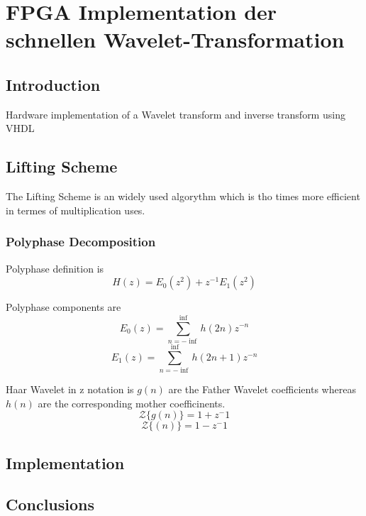 %
%
%
\chapter{FPGA Implementation der schnellen Wavelet-Transformation\label{chapter:fpga}}
\begin{refsection}

\section{Introduction}

Hardware implementation of a Wavelet transform and inverse transform using VHDL


\section{Lifting Scheme}

The Lifting Scheme is an widely used algorythm which is tho times more efficient in termes of multiplication uses. 


\subsection{Polyphase Decomposition}


Polyphase definition is
\begin{equation}
H(z)=E_{0}(z^2)+z^{−1} E_1(z^2)
\end{equation}

Polyphase components are
\begin{equation}
E_0(z) = \sum_{n=-\inf}^\inf h(2n)z^{-n}
\end{equation}
\begin{equation}
E_1(z) = \sum_{n=-\inf}^\inf h(2n+1)z^{-n}
\end{equation}

Haar Wavelet in z notation is
$g(n)$ are the Father Wavelet coefficients whereas $h(n)$ are the corresponding mother coefficinents. 
\begin{equation}
{\mathcal {Z}} \{g(n)\} = 1 + z^-1
\end{equation}
\begin{equation}
{\mathcal {Z}} \{(n)\} = 1 - z^-1
\end{equation}


\section{Implementation}


\section{Conclusions}

\printbibliography[heading=subbibliography]
\end{refsection}
